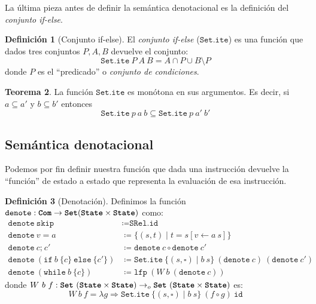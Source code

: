 \documentclass[
  a4paper, 
  10pt, 
  parskip=half, 
  toc=bibliography,
]{scrbook}
\theoremstyle{definition}
\theoremstyle{bolddef}
\newtheorem{theorem}{Teorema}[section]
\newtheorem{definition}[theorem]{Definición}
\newcommand{\funfont}[1]{\texttt{#1}}
\newcommand{\tyfont}[1]{\texttt{\textbf{#1}}}
\renewcommand{\mapsto}{\Rightarrow}
\newcommand{\placeholder}{\square}
\newcommand{\ImpIfElse}[3]{\texttt{if} \ {#1} \ \{{#2}\} \ \texttt{else} \ \{{#3}\}}
\newcommand{\ImpWhile}[2]{\texttt{while} \ {#1} \ \{{#2}\}}
\newcommand{\ImpConcat}[2]{{#1} \texttt{;} \ {#2}}
\newcommand{\ImpSkip}{\texttt{skip}}
\newcommand{\ImpAssign}[2]{{#1} = {#2}}
\begin{document}
La última pieza antes de definir la semántica denotacional es la definición
del \emph{conjunto if-else}.

\begin{definition}[Conjunto if-else]
  El \emph{conjunto if-else} (\(\funfont{Set.ite}\)) es una función que dados tres conjuntos \(P, A, B\)
  devuelve el conjunto:
  \[
    \funfont{Set.ite} \ P \ A \ B = A \cap P \cup B \setminus P
  \]
  donde \(P\) es el \enquote{predicado} o \emph{conjunto de condiciones}.
\end{definition}

\begin{theorem}\label{thm:ite_monotone}
  La función \(\funfont{Set.ite}\) es monótona en sus argumentos.
  Es decir, si \(a \subseteq a'\) y \(b \subseteq b'\) entonces
  \[
  \funfont{Set.ite} \ p \ a \ b \subseteq \funfont{Set.ite} \ p \ a' \ b'
  \]
\end{theorem}

\subsection{Semántica denotacional}

Podemos por fin definir nuestra función que dada una instrucción devuelve la
\enquote{función} de estado a estado que representa la evaluación de esa instrucción.

\begin{definition}[Denotación]
Definimos la función \(\funfont{denote}: \tyfont{Com} \to \tyfont{Set} (\tyfont{State} \times \tyfont{State})\)
como:
  \begin{align*}
    \funfont{denote} \ \ImpSkip &\coloneqq \funfont{SRel.id} \\
    \funfont{denote} \ \ImpAssign{v}{a} &\coloneqq \{(s, t) \mid t = s[v \leftarrow a \ s]\} \\
    \funfont{denote} \ \ImpConcat{c}{c'} &\coloneqq \funfont{denote} \ c \circ \funfont{denote} \ c' \\
    \funfont{denote} \ (\ImpIfElse{b}{c}{c'}) &\coloneqq \funfont{Set.ite} \ \{(s, \placeholder) \mid b \ s\} \ (\funfont{denote} \ c) \ (\funfont{denote} \ c') \\
    \funfont{denote} \ (\ImpWhile{b}{c}) &\coloneqq \funfont{lfp} \ (W \ b \ (\funfont{denote} \ c))
  \end{align*}
  donde \(W \ b \ f:\tyfont{Set} \ (\tyfont{State} \times \tyfont{State}) \to_o 
    \tyfont{Set} \ (\tyfont{State} \times \tyfont{State})\) es:
  \[
    W \ b \ f = \lambda g \mapsto \funfont{Set.ite} \ \{(s, \placeholder) \mid b \ s\} \ (f \circ g) \ \funfont{id}
  \]
\end{definition}
\end{document}
